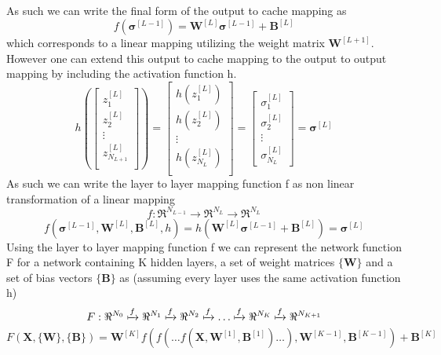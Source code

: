 \documentclass[12pt]{article}
\begin{document}
As such we can write the final form of the output to cache mapping as
\begin{equation}
f\left( \bm{\sigma} ^{[L-1]}\right) = \textbf{W}^{[L]}\bm{\sigma}^{[L-1]}+\textbf{B}^{[L]}
\end{equation}
which corresponds to a linear mapping utilizing the weight matrix $\textbf{W}^{[L+1]}$. However one can extend this output to cache mapping to the output to output mapping by including the activation function h.
\begin{equation}
h
\left(
\begin{bmatrix}
z^{[L]}_1 \\
z^{[L]}_2 \\
\vdots \\
z^{[L]}_{N_{L+1}} \\
\end{bmatrix}
\right)
=	
\begin{bmatrix}
h\left(z^{[L]}_1\right) \\
h\left(z^{[L]}_2 \right) \\
\vdots \\
h\left(z^{[L]}_{N_{L}} \right) \\
\end{bmatrix}
=
\begin{bmatrix}
\sigma^{[L]}_1 \\
\sigma^{[L]}_2 \\
\vdots \\
\sigma^{[L]}_{N_{L}}
\end{bmatrix}
= \bm{\sigma}^{[L]}		 
\end{equation}
As such we can write the layer to layer mapping function f as non linear transformation of a linear mapping
\begin{equation*}
f:\Re^{N_{L-1}}\rightarrow\Re^{N_{L}}\rightarrow\Re^{N_{L}}
\end{equation*}
\begin{equation}
f\left(\bm{\sigma}^{[L-1]}, \textbf{W}^{[L]}, \textbf{B}^{[L]}, h\right) = h\left(\textbf{W}^{[L]}\bm{\sigma}^{[L-1]}+\textbf{B}^{[L]}\right) = \bm{\sigma}^{[L]}
\end{equation}
Using the layer to layer mapping function f we can represent the network function F for a network containing K hidden layers, a set of weight matrices $\{\textbf{W}\}$ and a set of bias vectors $\{\textbf{B}\}$ as (assuming every layer uses the same activation function h)
\begin{equation}\label{network symbolic}
F: \Re^{N_0} \xmapsto{f} \Re^{N_1} \xmapsto{f} \Re^{N_2} \xmapsto{f} \dots \xmapsto{f} \Re^{N_{K}} \xmapsto{f} \Re^{N_{K+1}}
\end{equation}
\begin{equation}\label{network function}
F\left(\textbf{X}, \{\textbf{W}\}, \{\textbf{B}\}\right) = \textbf{W}^{[K]}f\left(f\left(\dots f\left(\textbf{X},\textbf{W}^{[1]}, \textbf{B}^{[1]}\right) \dots \right), \textbf{W}^{[K-1]}, \textbf{B}^{[K-1]}\right) + \textbf{B}^{[K]}
\end{equation} 
\end{document}
